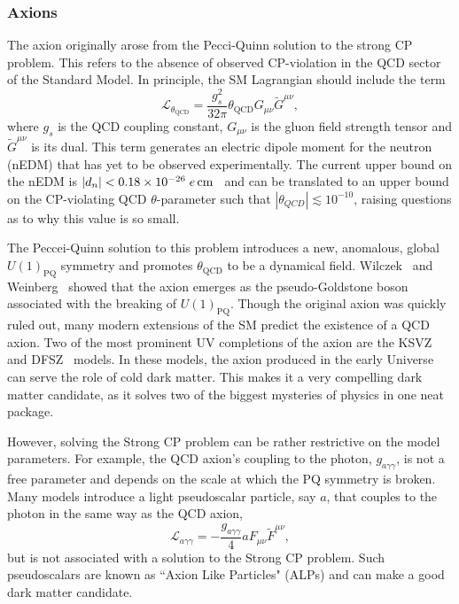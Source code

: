 \subsubsection{Axions}
The axion originally arose from the Pecci-Quinn solution to the strong CP problem. This refers to the absence of observed CP-violation in the QCD sector of the Standard Model. In principle, the SM Lagrangian should include the term
\begin{equation}
    \mathcal{L}_{\theta_\mathrm{QCD}} = \frac{g_s^2}{32 \pi}\theta_\mathrm{QCD} G_{\mu\nu} \tilde{G}^{\mu\nu},
\end{equation}
where $g_s$ is the QCD coupling constant, $G_{\mu\nu}$ is the gluon field strength tensor and $\tilde{G}^{\mu\nu}$ is its dual. This term generates an electric dipole moment for the neutron (nEDM) that has yet to be observed experimentally. The current upper bound on the nEDM is $|d_n| < 0.18\times 10^{-26}\;e{\rm \,cm}$~\cite{Abel:2020pzs_feb_MeasurementPermanentElectric} and can be translated to an upper bound on the CP-violating QCD $\theta$-parameter such that $|\theta_{QCD}|\lesssim 10^{-10}$, raising questions as to why this value is so small. 

The Peccei-Quinn solution to this problem introduces a new, anomalous, global  $U(1)_{\mathrm{PQ}}$ symmetry and promotes $\theta_\mathrm{QCD}$ to be a dynamical field.
Wilczek~\cite{Wilczek:1977pj_ProblemStrongInvariance} and Weinberg~\cite{Weinberg:1977ma_NewLightBoson} showed that the axion emerges as the pseudo-Goldstone boson associated with the breaking of $U(1)_\mathrm{PQ}$. Though the original axion was quickly ruled out, many modern extensions of the SM predict the existence of a QCD axion. Two of the most prominent UV completions of the axion are the KSVZ~\cite{Kim:1979if_WeakInteractionSinglet, Shifman:1979if_CanConfinementEnsure} and DFSZ~\cite{Zhitnitsky_PossibleSuppressionAxion, Dine:1981rt_SimpleSolutionStrong} models. In these models, the axion produced in the early Universe can serve the role of cold dark matter. This makes it a very compelling dark matter candidate, as it solves two of the biggest mysteries of physics in one neat package. 

However, solving the Strong CP problem can be rather restrictive on the model parameters. For example, the QCD axion's coupling to the photon, $g_{a\gamma\gamma}$, is not a free parameter and depends on the scale at which the PQ symmetry is broken. Many models introduce a light pseudoscalar particle, say $a$, that couples to the photon in the same way as the QCD axion,  
\begin{equation}
    \mathcal{L}_{a\gamma\gamma} = -\frac{g_{a\gamma\gamma}}{4} a F_{\mu\nu}\tilde{F}^{\mu\nu},
\end{equation}
but is not associated with a solution to the Strong CP problem. Such pseudoscalars are known as ``Axion Like Particles" (ALPs) and can make a good dark matter candidate.

